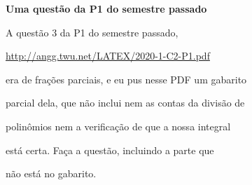 \documentclass[oneside,12pt]{article}
\begin{document}

{\bf Uma questão da P1 do semestre passado}

A questão 3 da P1 do semestre passado,

\ssk

\url{http://angg.twu.net/LATEX/2020-1-C2-P1.pdf}

\ssk

era de frações parciais, e eu pus nesse PDF um gabarito

parcial dela, que não inclui nem as contas da divisão de

polinômios nem a verificação de que a nossa integral

está certa. Faça a questão, incluindo a parte que

não está no gabarito.





\end{document}
